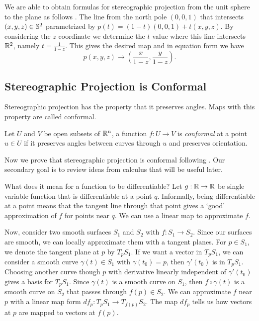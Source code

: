 We are able to obtain formulas for stereographic projection from
the unit sphere to the plane as follows \cite{christian-notes}.
The line from the north pole $(0,0,1)$ that intersects $(x,y,z)\in \mathbb{S}^2$ parametrized by 
$p(t)=(1-t)(0,0,1)+t(x,y,z)$. By considering the $z$ coordinate we determine the $t$ value where this line
intersects $\mathbb{R}^2$, namely $t=\frac{1}{1-z}.$
This gives the desired map  and in equation form we have
$$p(x,y,z)\to \left(\frac{x}{1-z},\frac{y}{1-z}\right).$$






\subsection{Stereographic Projection is Conformal}


Stereographic projection has the property that it preserves angles.
Maps with this property are called conformal. 
\begin{definition}[Conformal]\label{def:conformal}
	Let $U$ and $V$ be open subsets of $\mathbb{R}^n$, a function $f:U\to V$ is
	\emph{conformal} at a point $u\in U$ if it preserves angles between curves
	through $u$ and preserves orientation.
\end{definition}

Now we prove that stereographic projection is conformal following \cite{hilbert-imagination}.
Our secondary goal is to review ideas from calculus that will be useful later.

What does it mean for a function to be differentiable? Let $g:\mathbb{R}\rightarrow \mathbb{R}$ be single variable function that is differentiable at a point $q$. Informally, being differentiable at a point means that the tangent
line through that point gives a `good' approximation of $f$ for points near $q$. We can use a linear map to approximate $f$. 

Now, consider two smooth surfaces $S_1$ and $S_2$ with $f:S_1\rightarrow S_2.$ Since our
surfaces are smooth, we can locally approximate them with a tangent planes. 
For $p\in S_1$, we denote the tangent plane at $p$ by $T_pS_1.$ If we want a vector in $T_pS_1$,
we can consider a smooth curve $\gamma(t)\in S_1$ with $\gamma(t_0)=p$, then $\gamma'(t_0)$ 
is in $T_pS_1.$ Choosing another curve though $p$ with derivative linearly independent of $\gamma'(t_0)$
gives a basis for $T_pS_1$.
Since $\gamma(t)$ is a smooth curve on $S_1$, then $f\circ \gamma(t)$ is a smooth curve
on $S_2$ that passes through $f(p)\in S_2.$
We can approximate $f$ near $p$ with a linear map form $df_p:T_pS_1\rightarrow T_{f(p)}S_2.$
The map $df_p$ tells us how vectors at $p$ are mapped to vectors at $f(p).$

